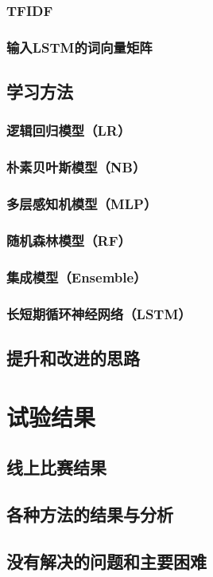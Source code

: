 \documentclass[a4paper]{article}
\begin{document}
     \subsubsection{TFIDF}
     \subsubsection{输入LSTM的词向量矩阵}
    \subsection{学习方法}
   	 \subsubsection{逻辑回归模型（LR）}
   	 \subsubsection{朴素贝叶斯模型（NB）}
   	 \subsubsection{多层感知机模型（MLP）}
   	 \subsubsection{随机森林模型（RF）}
   	 \subsubsection{集成模型（Ensemble）}
   	 \subsubsection{长短期循环神经网络（LSTM）}
    \subsection{提升和改进的思路}
   \section{试验结果}
   	\subsection{线上比赛结果}
   	\subsection{各种方法的结果与分析}
   	\subsection{没有解决的问题和主要困难}
\end{document}
